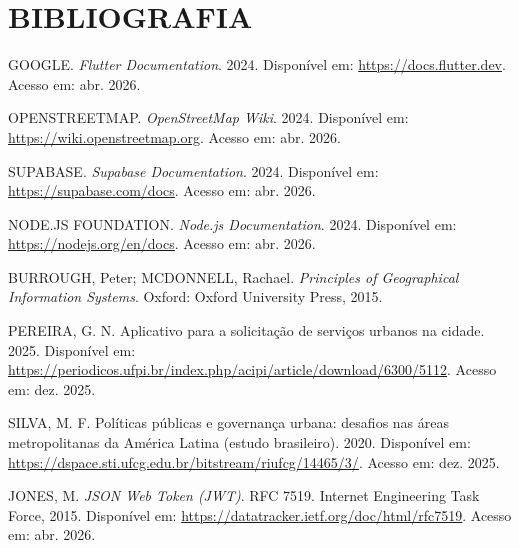 
\section{BIBLIOGRAFIA}

GOOGLE. \textit{Flutter Documentation}. 2024. Disponível em:
\url{https://docs.flutter.dev}. Acesso em: abr. 2026.

OPENSTREETMAP. \textit{OpenStreetMap Wiki}. 2024. Disponível em:
\url{https://wiki.openstreetmap.org}. Acesso em: abr. 2026.

SUPABASE. \textit{Supabase Documentation}. 2024. Disponível em:
\url{https://supabase.com/docs}. Acesso em: abr. 2026.

NODE.JS FOUNDATION. \textit{Node.js Documentation}. 2024. Disponível em:
\url{https://nodejs.org/en/docs}. Acesso em: abr. 2026.

BURROUGH, Peter; MCDONNELL, Rachael. \textit{Principles of Geographical
Information Systems}. Oxford: Oxford University Press, 2015.

PEREIRA, G. N. Aplicativo para a solicitação de serviços urbanos na cidade.
2025. Disponível em:
\url{https://periodicos.ufpi.br/index.php/acipi/article/download/6300/5112}.
Acesso em: dez. 2025.

SILVA, M. F. Políticas públicas e governança urbana: desafios nas áreas
metropolitanas da América Latina (estudo brasileiro). 2020. Disponível em:
\url{https://dspace.sti.ufcg.edu.br/bitstream/riufcg/14465/3/}. Acesso em:
dez. 2025.

JONES, M. \textit{JSON Web Token (JWT)}. RFC 7519. Internet Engineering Task
Force, 2015. Disponível em: \url{https://datatracker.ietf.org/doc/html/rfc7519}.
Acesso em: abr. 2026.
